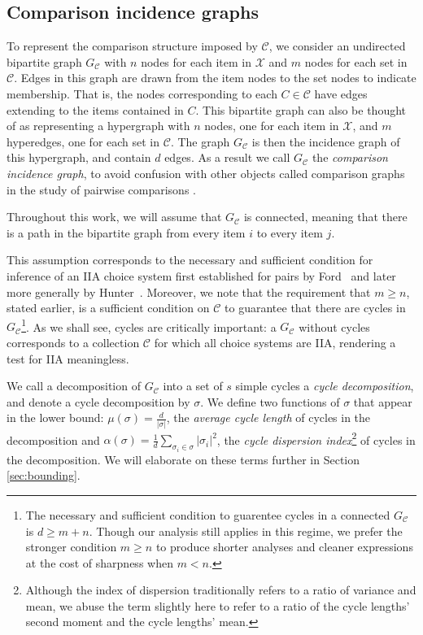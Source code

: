 \documentclass[10pt]{article}
\begin{document}
\begin{ReviewVerbatim}
\subsection{Comparison incidence graphs}\label{subsection:comparison_graph}
	To represent the comparison structure imposed by $\mathcal{C}$, we consider an undirected bipartite graph $G_\mathcal{C}$ with $n$ nodes for each item in $\mathcal{X}$ and $m$ nodes for each set in $\mathcal{C}$. Edges in this graph are drawn from the item nodes to the set nodes to indicate membership. That is, the nodes corresponding to each $C \in \mathcal{C}$ have edges extending to the items contained in $C$. This bipartite graph can also be thought of as representing a hypergraph with $n$ nodes, one for each item in $\mathcal{X}$, and $m$ hyperedges, one for each set in $\mathcal{C}$. The graph $G_\mathcal{C}$ is then the incidence graph of this hypergraph, and contain $d$ edges. As a result we call $G_\mathcal{C}$ the {\it comparison incidence graph}, to avoid confusion with other objects called comparison graphs in the study of pairwise comparisons \cite{ford1957solution,negahban2016rank}.

	Throughout this work, we will assume that $G_\mathcal{C}$ is connected, meaning that there is a path in the bipartite graph from every item $i$ to every item $j$.

	This assumption corresponds to the necessary and sufficient condition for inference of an IIA choice system first established for pairs by Ford~\cite{ford1957solution} and later more generally by Hunter~\cite{hunter2004mm}. Moreover, we note that the requirement that $m \geq n$, stated earlier, is a sufficient condition on $\mathcal{C}$ to guarantee that there are cycles in $G_\mathcal{C}$\footnote{The necessary and sufficient condition to guarentee cycles in a connected $G_\mathcal{C}$ is $d \geq m + n$. Though our analysis still applies in this regime, we prefer the stronger condition $m \geq n$ to produce shorter analyses and cleaner expressions at the cost of sharpness when $m < n$.}. As we shall see, cycles are critically important: a $G_\mathcal{C}$ without cycles corresponds to a collection $\mathcal{C}$ for which all choice systems are IIA, rendering a test for IIA meaningless.

	We call a decomposition of $G_\mathcal{C}$ into a set of $s$ simple cycles a {\it cycle decomposition}, and denote a cycle decomposition by $\sigma$. We define two functions of $\sigma$ that appear in the lower bound: $\mu(\sigma) = \frac{d}{|\sigma|}$, the \textit{average cycle length} of cycles in the decomposition and $\alpha(\sigma) = \frac{1}{d}\sum_{\sigma_i \in \sigma} |\sigma_i|^2$, the \textit{cycle dispersion index}\footnote{Although the index of dispersion traditionally refers to a ratio of variance and mean, we abuse the term slightly here to refer to a ratio of the cycle lengths' second moment and the cycle lengths' mean.} of cycles in the decomposition. We will elaborate on these terms further in Section \ref{sec:bounding}.


\end{ReviewVerbatim}
\end{document}
